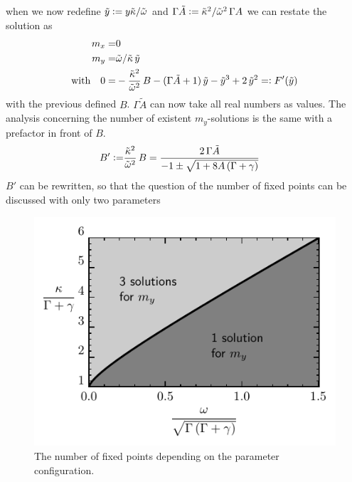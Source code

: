 \documentclass{article}
\begin{document}
when we now redefine $\tilde{y}\vcentcolon=y\tilde{\kappa}/\tilde{\omega}$ and $\Gamma\tilde{A}\vcentcolon=\tilde{\kappa}^2/\tilde{\omega}^2\,\Gamma A$ we can restate the solution as
\begin{align*}
    m_x=&0\\
    m_y=&\tilde{\omega}/\tilde{\kappa}\,\tilde{y}\\
    \text{with}\quad0=&-\frac{\tilde{\kappa}^2}{\tilde{\omega}^2}\,B-(\Gamma \tilde{A}+1)\,\tilde{y}    - \tilde{y}^3+2\,\tilde{y}^2=\vcentcolon F'(\tilde{y})
\end{align*}
with the previous defined $B$. $\Gamma \tilde{A}$ can now take all real numbers as values. The analysis concerning the number of existent $m_y$-solutions is the same with a prefactor in front of $B$. 
\begin{align*}
    B'\vcentcolon=&\frac{\tilde{\kappa}^2}{\tilde{\omega}^2}\,B=\frac{2\,\Gamma \tilde{A}}{-1\pm\sqrt{1+8A\,(\Gamma+\gamma)}}
\end{align*}
$B'$ can be rewritten, so that the question of the number of fixed points can be discussed with only two parameters
\begin{figure}
    \includegraphics{pictures/numb_fixp.pdf}
    \vspace*{-2cm}\caption{The number of fixed points depending on the parameter configuration.}
    \label{fig:numb_fixp}
\end{figure}\\ 
\end{document}
